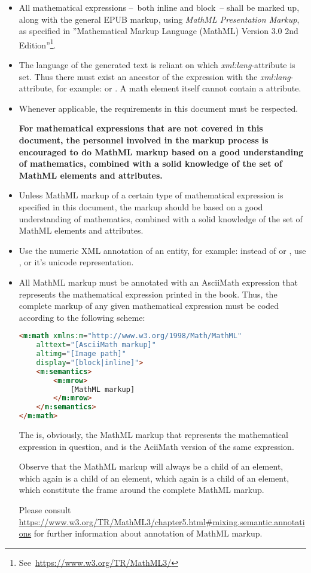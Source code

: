 \documentclass[english,a4paper,11pt]{article}
\begin{document}
\begin{itemize}
	\item All mathematical expressions --~both inline and block~-- shall be marked up, along with the general EPUB markup, using \emph{MathML Presentation Markup}, as specified in ''Mathematical Markup Language (MathML) Version 3.0 2nd Edition''\footnote{See~\url{https://www.w3.org/TR/MathML3/}}.
	\item The language of the generated text is reliant on which \emph{xml:lang}-attribute is set. Thus there must exist an ancestor of the expression with the \emph{xml:lang}-attribute, for example:  or . A math element itself cannot contain a  attribute.
	\item Whenever applicable, the requirements in this document must be respected.
	
	\textbf{For mathematical expressions that are not covered in this document, the personnel involved in the markup process is encouraged to do MathML markup based on a good understanding of mathematics, combined with a solid knowledge of the set of MathML elements and attributes.}

	\item Unless MathML markup of a certain type of mathematical expression is specified in this document, the markup should be based on a good understanding of mathematics, combined with a solid knowledge of the set of MathML elements and attributes.
	\item Use the numeric XML annotation of an entity, for example: instead of  or , use , or it's unicode representation.
	\item All MathML markup must be annotated with an AsciiMath expression that represents the mathematical expression printed in the book. Thus, the complete markup of any given mathematical expression must be coded according to the following scheme:

\begin{lstlisting}[language=HTML, caption={Default MathML markup}]
<m:math xmlns:m="http://www.w3.org/1998/Math/MathML"
	alttext="[AsciiMath markup]" 
	altimg="[Image path]" 
	display="[block|inline]">
	<m:semantics>
		<m:mrow>
			[MathML markup]
		</m:mrow>
	</m:semantics>
</m:math>
\end{lstlisting}

	The  is, obviously, the MathML markup that represents the mathematical expression in question, and  is the AciiMath version of the same expression.

Observe that the MathML markup will always be a child of an  element, which again is a child of an  element, which again is a child of an  element, which constitute the frame around the complete MathML markup.

\bigskip
Please consult \url{https://www.w3.org/TR/MathML3/chapter5.html#mixing.semantic.annotations} for further information about annotation of MathML markup.
\end{itemize}
\end{document}
